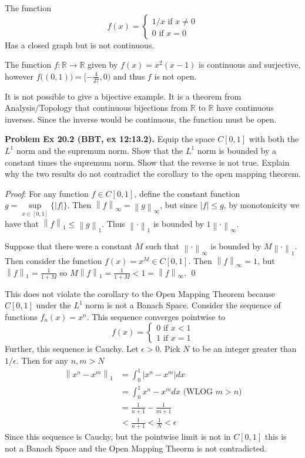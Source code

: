 \documentclass[12pt]{article}
\newcommand{\problem}[1]{\hspace{-4 ex} \large \textbf{Problem #1} }
\newcommand{\norm}[1]{\left\lVert#1\right\rVert}
\renewenvironment{proof}{\hspace{-4 ex} \emph{Proof}:}{\qed}
\newcommand{\RR}{\mathbb{R}}
\begin{document}
	The function 
	$$
	f(x) = \begin{cases}
		1/x \text{\ \ \ if $x \neq 0$} \\
		0 \text{\ \ \ if $x = 0$}
	\end{cases}
	$$
	Has a closed graph but is not continuous. \bigbreak
	
	The function $f: \RR \to \RR$ given by $f(x) = x^2(x-1)$ is continuous and surjective, however $f\big( (0,1) \big) = [-\tfrac{4}{27},0)$ and thus $f$ is not open. \bigbreak
	
	It is not possible to give a bijective example. It is a theorem from Analysis/Topology that continuous bijections from $\RR$ to $\RR$ have continuous inverses. Since the inverse would be continuous, the function must be open. 

\bigbreak
\problem{Ex 20.2 (BBT, ex 12:13.2).} Equip the space $C[0,1]$ with both the $L^1$ norm and the supremum norm. Show that the $L^1$ norm is bounded by a constant times the supremum norm. Show that the reverse is not true. Explain why the two results do not contradict the corollary to the open mapping theorem. \bigbreak

	\begin{proof}
		For any function $f \in C[0,1]$, define the constant function $g = \sup\limits_{x \in [0,1]}\{\vert f \vert \}$. Then $\norm{f}_\infty = \norm{g}_\infty$, but since $\vert f \vert  \leq g$, by monotonicity we have that $\norm{f}_1 \leq \norm{g}_1$. Thus $\norm{\cdot}_1$ is bounded by $1\norm{\cdot}_\infty$. \bigbreak
		
		Suppose that there were a constant $M$ such that $\norm{\cdot}_\infty$ is bounded by $M\norm{\cdot}_1$. Then consider the function $f(x) = x^{M} \in C[0,1]$. Then $\norm{f}_\infty = 1$, but $\norm{f}_1 = \tfrac{1}{1+M}$ so $M \norm{f}_1 = \tfrac{1}{1+M} < 1 = \norm{f}_\infty$.
	\end{proof}
	
	This does not violate the corollary to the Open Mapping Theorem because $C[0,1]$ under the $L^1$ norm is not a Banach Space. Consider the sequence of functions $f_n(x) = x^n$. This sequence converges pointwise to 
	$$
	f(x) =
	\begin{cases}
		0 \text{\ \ if $x<1$}\\
		1 \text{\ \ if $x=1$}
	\end{cases}
	$$
	Further, this sequence is Cauchy. Let $\epsilon > 0$. Pick $N$ to be an integer greater than $1/\epsilon$. Then for any $n,m>N$
	\begin{align*}
		\norm{x^n - x^m}_1 & = \int_0^1\vert x^n - x^m \vert dx \\
		& = \int_0^1 x^n - x^m dx \text{\ \ \ (WLOG $m>n$)}\\
		& = \tfrac{1}{n+1} - \tfrac{1}{m+1} \\
		& < \tfrac{1}{n+1} < \tfrac{1}{N} < \epsilon
	\end{align*}
	Since this sequence is Cauchy, but the pointwise limit is not in $C[0,1]$ this is not a Banach Space and the Open Mapping Theorm is not contradicted. 
\end{document}
